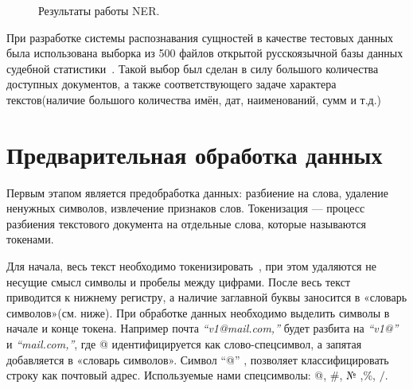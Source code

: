 \documentclass{csmathnotes}
\begin{document}
\begin{figure}[h]
	\caption{Результаты работы NER.}
	\label{fig:ner}
\end{figure}


При разработке системы распознавания сущностей в качестве тестовых данных была использована выборка из 500 файлов открытой русскоязычной базы данных судебной статистики~\cite{CourtsData}. Такой выбор был сделан в силу большого количества доступных документов, а также соответствующего задаче характера текстов(наличие большого количества имён, дат, наименований, сумм и т.д.)

\section*{Предварительная обработка данных}
Первым этапом является предобработка данных: разбиение на слова, удаление ненужных символов, извлечение признаков слов. 
Токенизация — процесс разбиения текстового документа на отдельные слова, которые называются токенами. 


Для начала, весь текст необходимо токенизировать~\cite{Ner}, при этом удаляются не несущие смысл символы и пробелы между цифрами. После весь текст приводится к нижнему регистру, а наличие заглавной буквы заносится в «словарь символов»(см. ниже).
При обработке данных необходимо выделить символы в начале и конце токена.  Например почта \emph{“v1@mail.com,”} будет разбита на \emph{“v1@”} и \emph{“mail.com,”}, где @ идентифицируется как слово-спецсимвол, а запятая добавляется в «словарь символов». Символ “@” , позволяет классифицировать строку как почтовый адрес. Используемые нами спецсимволы: @, \#, № ,\%, $/$.
\end{document}
